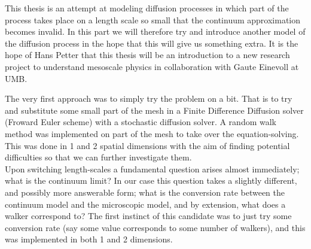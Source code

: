 This thesis is an attempt at modeling diffusion processes in which part of the process takes place on a length scale so small that the continuum approximation becomes invalid. 
In this part we will therefore try and introduce another model of the diffusion process in the hope that this will give us something extra. 
It is the hope of Hans Petter that this thesis will be an introduction to a new research project to understand mesoscale physics in collaboration with Gaute Einevoll at UMB.

The very first approach was to simply try the problem on a bit. That is to try and substitute some small part of the mesh in a Finite Difference Diffusion solver (Froward Euler scheme) with a stochastic diffusion solver. A random walk method was implemented on part of the mesh to take over the equation-solving. This was done in 1 and 2 spatial dimensions with the aim of finding potential difficulties so that we can further investigate them. \\
Upon switching length-scales a fundamental question arises almost immediately; what is the continuum limit? In our case this question takes a slightly different, and possibly more answerable form; what is the conversion rate between the continuum model and the microscopic model, and by extension, what does a walker correspond to?
The first instinct of this candidate was to just try some conversion rate (say some value corresponds to some number of walkers), and this was implemented in both 1 and 2 dimensions.

